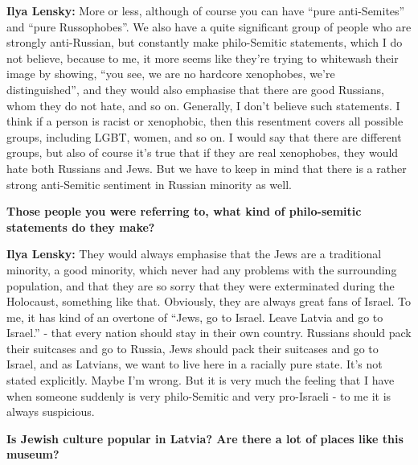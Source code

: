 \textbf{Ilya Lensky:} More or less, although of course you can have ``pure anti-Semites'' and ``pure Russophobes''. We also have a quite significant group of people who are strongly anti-Russian, but constantly make philo-Semitic statements, which I do not believe, because to me, it more seems like they’re trying to whitewash their image by showing, ``you see, we are no hardcore xenophobes, we’re distinguished'', and they would also emphasise that there are good Russians, whom they do not hate, and so on. Generally, I don’t believe such statements. I think if a person is racist or xenophobic, then this resentment covers all possible groups, including LGBT, women, and so on. I would say that there are different groups, but also of course it’s true that if they are real xenophobes, they would hate both Russians and Jews. But we have to keep in mind that there is a rather strong anti-Semitic sentiment in Russian minority as well. 

\textbf{Those people you were referring to, what kind of philo-semitic statements do they make?} 

\textbf{Ilya Lensky:} They would always emphasise that the Jews are a traditional minority, a good minority, which never had any problems with the surrounding population, and that they are so sorry that they were exterminated during the Holocaust, something like that. Obviously, they are always great fans of Israel. To me, it has kind of an overtone of ``Jews, go to Israel. Leave Latvia and go to Israel.'' - that every nation should stay in their own country. Russians should pack their suitcases and go to Russia, Jews should pack their suitcases and go to Israel, and as Latvians, we want to live here in a racially pure state. It’s not stated explicitly. Maybe I’m wrong. But it is very much the feeling that I have when someone suddenly is very philo-Semitic and very pro-Israeli - to me it is always suspicious. 

\textbf{Is Jewish culture popular in Latvia? Are there a lot of places like this museum?}

